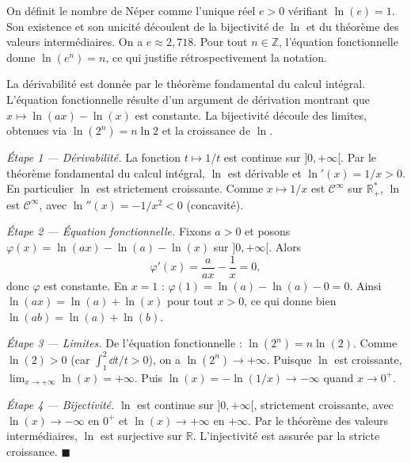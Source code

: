 On définit le nombre de Néper comme l'unique réel $e > 0$
vérifiant $\ln(e) = 1$. Son existence et son unicité découlent de la
bijectivité de $\ln$ et du théorème des valeurs intermédiaires. On a
$e \approx 2{,}718$. Pour tout $n \in \mathbb{Z}$, l'équation fonctionnelle
donne $\ln(e^n) = n$, ce qui justifie rétrospectivement la notation.

\decsep{}


\begin{ideepreuve}
La dérivabilité est donnée par le théorème fondamental du calcul intégral.
L'équation fonctionnelle résulte d'un argument de dérivation montrant que
$x\mapsto\ln(ax)-\ln(x)$ est constante. La bijectivité découle des limites,
obtenues via $\ln(2^n)=n\ln 2$ et la croissance de $\ln$.
\end{ideepreuve}

\vspace{10pt}

\begin{mdframed}[style=proofbar]
  \textit{Étape 1 — Dérivabilité.}
  La fonction $t\mapsto 1/t$ est continue sur $]0,+\infty[$. Par le théorème
  fondamental du calcul intégral,
  $\ln$ est dérivable et $\ln'(x) = 1/x > 0$. En particulier $\ln$ est
  strictement croissante. Comme $x\mapsto 1/x$ est $\mathcal{C}^\infty$ sur
  $\mathbb{R}_+^*$, $\ln$ est $\mathcal{C}^\infty$, avec
  $\ln''(x) = -1/x^2 < 0$ (concavité).

  \medskip
  \textit{Étape 2 — Équation fonctionnelle.}
  Fixons $a > 0$ et posons $\varphi(x) = \ln(ax) - \ln(a) - \ln(x)$ sur
  $]0,+\infty[$. Alors
  \[
    \varphi'(x) = \frac{a}{ax} - \frac{1}{x} = 0,
  \]
  donc $\varphi$ est constante. En $x = 1$ : $\varphi(1) = \ln(a) - \ln(a) - 0 = 0$.
  Ainsi $\ln(ax) = \ln(a) + \ln(x)$ pour tout $x > 0$, ce qui donne bien
  $\ln(ab) = \ln(a) + \ln(b)$.

  \medskip
  \textit{Étape 3 — Limites.}
  De l'équation fonctionnelle : $\ln(2^n) = n\ln(2)$. Comme $\ln(2) > 0$
  (car $\int_1^2 \dd t/t > 0$), on a $\ln(2^n)\to+\infty$. Puisque $\ln$ est
  croissante, $\lim_{x\to+\infty}\ln(x)=+\infty$.
  Puis $\ln(x) = -\ln(1/x)\to-\infty$ quand $x\to 0^+$.

  \medskip
  \textit{Étape 4 — Bijectivité.}
  $\ln$ est continue sur $]0,+\infty[$, strictement croissante, avec
  $\ln(x)\to-\infty$ en $0^+$ et $\ln(x)\to+\infty$ en $+\infty$.
  Par le théorème des valeurs intermédiaires,
  $\ln$ est surjective sur $\mathbb{R}$. L'injectivité est assurée par la
  stricte croissance. \hfill$\blacksquare$
\end{mdframed}

